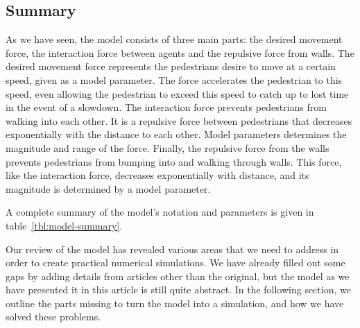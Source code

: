 \subsection{Summary}
As we have seen, the model consists of three main parts: the desired movement
force, the interaction force between agents and the repulsive force from
walls. The desired movement force represents the pedestrians desire to move at
a certain speed, given as a model parameter. The force accelerates the
pedestrian to this speed, even allowing the pedestrian to exceed this speed to
catch up to lost time in the event of a slowdown. The interaction force
prevents pedestrians from walking into each other. It is a repulsive force
between pedestrians that decreases exponentially with the distance to each
other. Model parameters determines the magnitude and range of the force.
Finally, the repulsive force from the walls prevents pedestrians from bumping
into and walking through walls. This force, like the interaction force,
decreases exponentially with distance, and its magnitude is determined by a
model parameter.

A complete summary of the model's notation and parameters is given in
table~\ref{tbl:model-summary}.

Our review of the model has revealed various areas that we need to address in
order to create practical numerical simulations. We have already filled out
some gaps by adding details from articles other than the original, but the
model as we have presented it in this article is still quite abstract. In the
following section, we outline the parts missing to turn the model into a
simulation, and how we have solved these problems.


